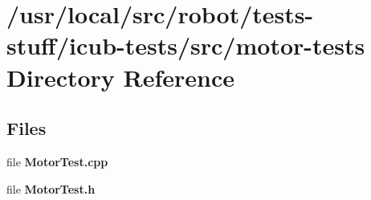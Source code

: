 \section{/usr/local/src/robot/tests-\/stuff/icub-\/tests/src/motor-\/tests Directory Reference}
\label{dir_e23a3429dde0fe0b23d0688ab6fbcab5}
\subsection*{Files}
\begin{DoxyCompactItemize}
\item 
file {\bfseries Motor\-Test.\-cpp}
\item 
file {\bfseries Motor\-Test.\-h}
\end{DoxyCompactItemize}
